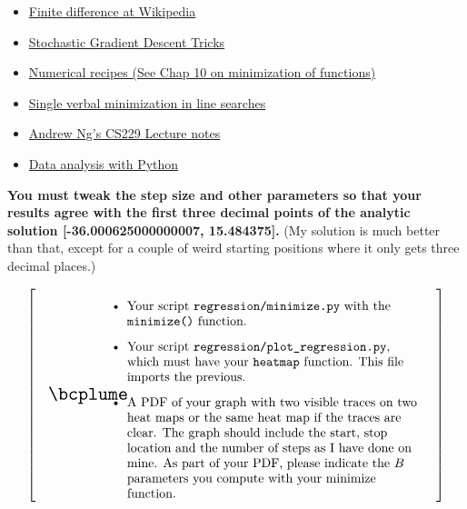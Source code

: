 \documentclass[titlepage]{tufte-book}
\makeatletter
\newenvironment{callout}[1]{
\[
  \left[
      \begin{tabular}{@{\quad}m{.05\textwidth}@{\qquad}m{.75\textwidth}@{\quad}}
        \scalebox{1.5}{#1} & 
          \raggedright%
}
{
      \end{tabular}
    \right]
\]
}
\makeatother
\begin{document}
\begin{fullwidth}
\begin{itemize}
\item \href{http://en.wikipedia.org/wiki/Finite_difference}{Finite difference at Wikipedia}
\item \href{http://research.microsoft.com/pubs/192769/tricks-2012.pdf}{Stochastic Gradient Descent Tricks}
\item \href{http://apps.nrbook.com/fortran/index.html}{Numerical recipes (See Chap 10 on minimization of functions)}
\item \href{http://adl.stanford.edu/aa222/Lecture_Notes_files/AA222-Lecture2.pdf}{Single verbal minimization in line searches}
\item \href{http://cs229.stanford.edu/notes/cs229-notes1.pdf}{Andrew Ng's CS229 Lecture notes}
\item \href{http://people.duke.edu/~ccc14/pcfb/analysis.html}{Data analysis with Python}
\end{itemize}

{\bf You must tweak the step size and other parameters so that your results agree with the first {\bf three} decimal points of the analytic solution [-36.000625000000007, 15.484375].} (My solution is much better than that, except for a couple of weird starting positions where it only gets three decimal places.)

\begin{callout}{\bcplume}
\begin{itemize}
\item Your script {\tt regression/minimize.py} with the {\tt minimize()} function.
\item Your script {\tt regression/plot\_regression.py}, which must have your {\tt heatmap} function.  This file imports the previous.
\item A PDF of your graph with two visible traces on two heat maps or the same heat map if the traces are clear. The graph should include the start, stop location and the number of steps as I have done on mine. As part of your PDF, please indicate the $B$ parameters you compute with your minimize function.
\end{itemize}
\end{callout}

\end{fullwidth}
\end{document}
